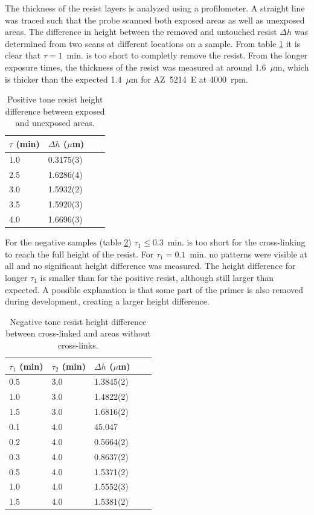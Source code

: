 
The thickness of the resist layers is analyzed using a profilometer. A straight line was traced such that the probe scanned both exposed areas as well as  unexposed areas. The difference in height between the removed and untouched resist $\Delta h$ was determined from two scans at different locations on a sample. From table \ref{tab:pos_profile} it is clear that $\tau = 1$~min. is too short to completly remove the resist. From the longer exposure times, the thickness of the resist was measured at around 1.6~$\mu$m, which is thicker than the expected 1.4~$\mu$m for AZ~5214~E at 4000~rpm.
\begin{table}[H]
    \centering
    \caption{Positive tone resist height difference between exposed and unexposed areas.}
    \begin{tabular}{X l l l}
        $\tau$ (min)& $\Delta h$ ($\mu$m) \\
        \hline\hline
        1.0 & 0.3175(3) \\
        2.5 & 1.6286(4) \\
        3.0 & 1.5932(2) \\
        3.5 & 1.5920(3) \\
        4.0 & 1.6696(3) \\
        \hline
    \end{tabular}
    \label{tab:pos_profile}
\end{table} For the negative samples (table \ref{tab:neg_profile}) $\tau_1 \leq 0.3$~min. is too short for the cross-linking to reach the full height of the resist. For $\tau_1 = 0.1$~min. no patterns were visible at all and no significant height difference was measured. The height difference for longer $\tau_1$ is smaller than for the positive resist, although still larger than expected. A possible explanation is that some part of the primer is also removed during development, creating a larger height difference. 
\begin{table}[H]
    \centering
    \caption{Negative tone resist height difference between cross-linked and areas without cross-links.}
    \begin{tabular}{X l l l l}
	$\tau_1$ (min) & $\tau_2$ (min) & $\Delta h$ ($\mu$m) \\
        \hline\hline
        0.5 & 3.0 & 1.3845(2)  \\
        1.0 & 3.0 & 1.4822(2)  \\
        1.5 & 3.0 & 1.6816(2)  \\
        0.1 & 4.0 & 45.047     \\
        0.2 & 4.0 & 0.5664(2)  \\
        0.3 & 4.0 & 0.8637(2)  \\
        0.5 & 4.0 & 1.5371(2)  \\
        1.0 & 4.0 & 1.5552(3)  \\
        1.5 & 4.0 & 1.5381(2)  \\
        \hline
    \end{tabular}
    \label{tab:neg_profile}
\end{table}

